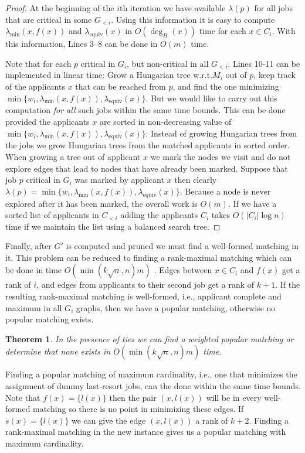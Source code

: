 \documentclass[11pt]{article}
\newcommand{\first}{f}
\newcommand{\second}{s}
\newcommand{\minlabel}{\ensuremath{\lambda_{\mathrm{min}}}}
\newcommand{\equivlabel}{\ensuremath{\lambda_{\mathrm{equiv}}}}
\newcommand{\lab}{\ensuremath{\lambda}}
\newcommand{\wrt}{{w.r.t.}\xspace}
\newtheorem{theorem}{Theorem}
\begin{document}
\begin{proof}
At the beginning of the $i$th iteration we have available $\lab(p)$ for all jobs that are critical in some $G_{< i}$. Using this information it is easy to compute $\minlabel(x,\first(x))$ and $\equivlabel(x)$ in $O(\deg_H(x))$ time for each $x \in C_i$. With this information, Lines 3--8 can be done in $O(m)$ time.

Note that for each $p$ critical in $G_i$, but non-critical in all $G_{<i}$, Lines 10-11 can be implemented in linear time: Grow a Hungarian tree \wrt $M_i$  out of $p$, keep track of the applicants $x$ that can be reached from $p$, and find the one minimizing $\min \{w_i, \minlabel(x,\first(x)), \equivlabel(x) \}$. But we would like to carry out this computation \emph{for all} such jobs within the same time bounds. This can be done provided the applicants $x$ are sorted in non-decreasing value of $\min \{w_i, \minlabel(x,\first(x)), \equivlabel(x) \}$: Instead of growing Hungarian trees from the jobs we grow Hungarian trees from the matched applicants in sorted order. When growing a tree out of applicant $x$ we mark the nodes we visit and do not explore edges that lead to nodes that have already been marked. Suppose that job $p$ critical in $G_i$ was marked by applicant $x$ then clearly $\lab(p) = \min \{w_i, \minlabel(x,\first(x)), \equivlabel(x) \}$. Because a node is never explored after it has been marked, the overall work is $O(m)$. If we have a sorted list of applicants in $C_{<i}$ adding the applicants $C_i$ takes $O(|C_i| \log n)$ time if we maintain the list using a balanced search tree.
\end{proof}

Finally, after $G'$ is computed and pruned we must find a well-formed matching in it. This problem can be reduced to finding a rank-maximal matching which can be done in time $O( \min(k \sqrt{n}, n) m)$ \cite{IKMMP06}. Edges between $x \in C_i$ and $\first(x)$ get a rank of $i$, and edges from applicants to their second job get a rank of $k+1$. If the resulting rank-maximal matching is well-formed, i.e., applicant complete and maximum in all $G_i$ graphs, then we have a popular matching, otherwise no popular matching exists.

\begin{theorem} In the presence of ties we can find a weighted popular matching or determine that none exists in $O( \min(k \sqrt{n}, n) m)$ time. \label{theorem:ties}
\end{theorem}

Finding a popular matching of maximum cardinality, i.e., one that minimizes the assignment of dummy last-resort jobs, can the done within the same time bounds. Note that $\first(x) = \{ l(x) \}$ then the pair $(x,l(x))$ will be in every well-formed matching so there is no point in minimizing these edges. If $\second(x) = \{ l(x) \}$ we can give the edge $(x, l(x))$ a rank of $k+2$. Finding a rank-maximal matching in the new instance gives us a popular matching with maximum cardinality.
\end{document}
